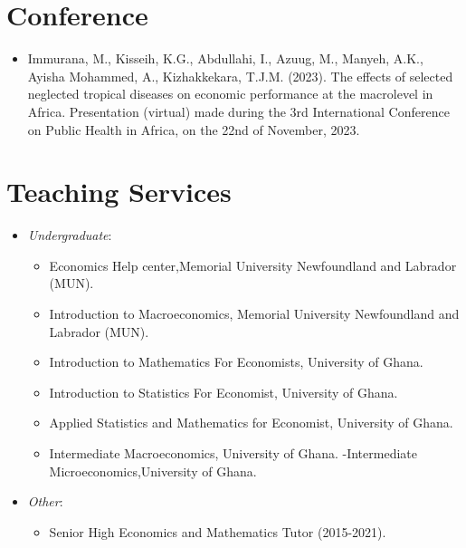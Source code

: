 \documentclass[
  letterpaper,
  DIV=11,
  numbers=noendperiod]{scrartcl}
\providecommand{\tightlist}{%
  \setlength{\itemsep}{0pt}\setlength{\parskip}{0pt}}\usepackage{longtable,booktabs,array}
\begin{document}
\hypertarget{conference}{%
\section{Conference}\label{conference}}

\begin{itemize}
\tightlist
\item
  Immurana, M., Kisseih, K.G., Abdullahi, I., Azuug, M., Manyeh, A.K.,
  Ayisha Mohammed, A., Kizhakkekara, T.J.M. (2023). The effects of
  selected neglected tropical diseases on economic performance at the
  macrolevel in Africa. Presentation (virtual) made during the 3rd
  International Conference on Public Health in Africa, on the 22nd of
  November, 2023.
\end{itemize}

\hypertarget{teaching-services}{%
\section{Teaching Services}\label{teaching-services}}

\begin{itemize}
\item
  \emph{Undergraduate}:

  \begin{itemize}
  \item
    Economics Help center,Memorial University Newfoundland and Labrador
    (MUN).
  \item
    Introduction to Macroeconomics, Memorial University Newfoundland and
    Labrador (MUN).
  \item
    Introduction to Mathematics For Economists, University of Ghana.
  \item
    Introduction to Statistics For Economist, University of Ghana.
  \item
    Applied Statistics and Mathematics for Economist, University of
    Ghana.
  \item
    Intermediate Macroeconomics, University of Ghana. -Intermediate
    Microeconomics,University of Ghana.
  \end{itemize}
\item
  \emph{Other}:

  \begin{itemize}
  \tightlist
  \item
    Senior High Economics and Mathematics Tutor (2015-2021).
  \end{itemize}
\end{itemize}
\end{document}
